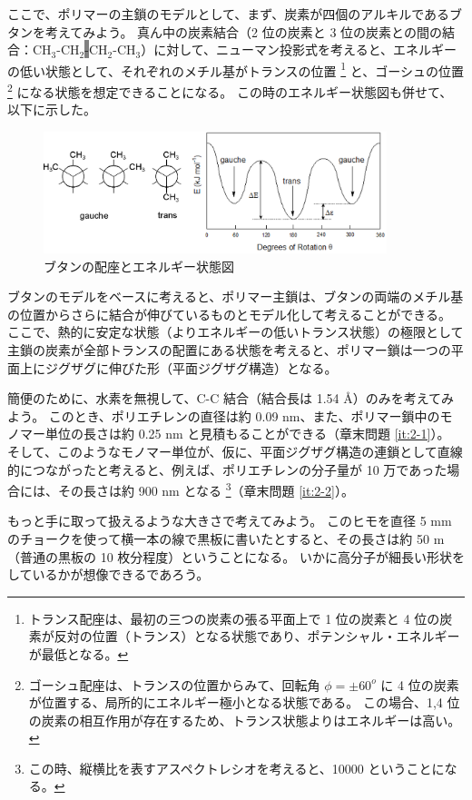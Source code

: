 \documentclass[uplatex,dvipdfmx,a4paper,11pt, titlepage]{jsarticle}
\begin{document}
ここで、ポリマーの主鎖のモデルとして、まず、炭素が四個のアルキルであるブタンを考えてみよう。
真ん中の炭素結合（2 位の炭素と 3 位の炭素との間の結合：CH$_3$-CH$_2$\colorbox{gray}{-}CH$_2$-CH$_3$）に対して、ニューマン投影式を考えると、エネルギーの低い状態として、それぞれのメチル基がトランスの位置
\footnote
{
トランス配座は、最初の三つの炭素の張る平面上で 1 位の炭素と 4 位の炭素が反対の位置（トランス）となる状態であり、ポテンシャル・エネルギーが最低となる。
}
と、ゴーシュの位置
\footnote
{
ゴーシュ配座は、トランスの位置からみて、回転角 $\phi = \pm 60^o$ に 4 位の炭素が位置する、局所的にエネルギー極小となる状態である。
この場合、1,4 位の炭素の相互作用が存在するため、トランス状態よりはエネルギーは高い。
}
になる状態を想定できることになる。
この時のエネルギー状態図も併せて、以下に示した。
\begin{figure}[htb]
 \centering
	\includegraphics[width=10cm]{figure/butane.eps}
	\caption{ブタンの配座とエネルギー状態図}
	\label{fig: butane}
\end{figure}

ブタンのモデルをベースに考えると、ポリマー主鎖は、ブタンの両端のメチル基の位置からさらに結合が伸びているものとモデル化して考えることができる。
ここで、熱的に安定な状態（よりエネルギーの低いトランス状態）の極限として主鎖の炭素が全部トランスの配置にある状態を考えると、ポリマー鎖は一つの平面上にジグザグに伸びた形（平面ジグザグ構造）となる。

簡便のために、水素を無視して、C-C 結合（結合長は 1.54 \AA）のみを考えてみよう。
このとき、ポリエチレンの直径は約 0.09 nm、また、ポリマー鎖中のモノマー単位の長さは約 0.25 nm と見積もることができる（章末問題 \ref{it:2-1}）。
そして、このようなモノマー単位が、仮に、平面ジグザグ構造の連鎖として直線的につながったと考えると、例えば、ポリエチレンの分子量が 10 万であった場合には、その長さは約 900 nm となる
\footnote
{
この時、縦横比を表すアスペクトレシオを考えると、10000 ということになる。
}（章末問題 \ref{it:2-2}）。

もっと手に取って扱えるような大きさで考えてみよう。
このヒモを直径 5 mm のチョークを使って横一本の線で黒板に書いたとすると、その長さは約 50 m （普通の黒板の 10 枚分程度）ということになる。
いかに高分子が細長い形状をしているかが想像できるであろう。
 
\end{document}
